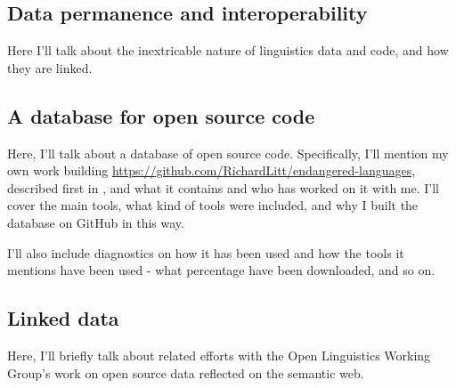 

\subsection{Data permanence and interoperability}

Here I'll talk about the inextricable nature of linguistics data and code, and how they are linked.

\subsection{A database for open source code}\label{sec:solutions}

Here, I'll talk about a database of open source code. Specifically, I'll mention my own work building \href{https://github.com/RichardLitt/endangered-languages}{https://github.com/RichardLitt/endangered-languages}, described first in \citet{CCURL}, and what it contains and who has worked on it with me. I'll cover the main tools, what kind of tools were included, and why I built the database on GitHub in this way.

I'll also include diagnostics on how it has been used and how the tools it mentions have been used - what percentage have been downloaded, and so on.

\subsection{Linked data}

Here, I'll briefly talk about related efforts with the Open Linguistics Working Group's \citep{chiarcos2012open} work on open source data reflected on the semantic web.\citep{chiarcos2013building}



%


